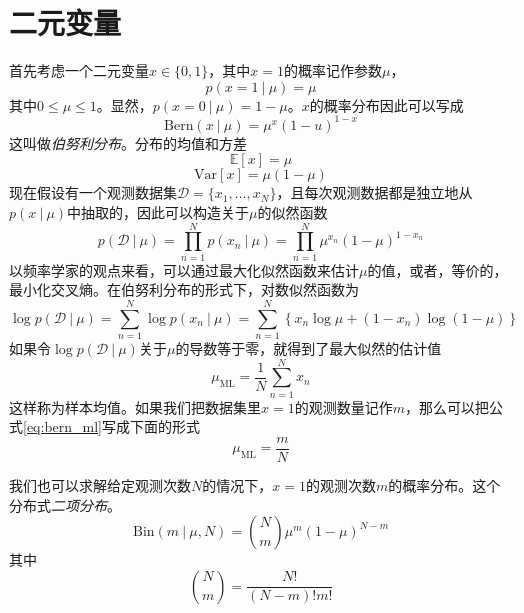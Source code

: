 \documentclass[11pt]{ctexbook}
\begin{document}
\section{二元变量}
首先考虑一个二元变量$x \in \{0, 1\}$，其中$x=1$的概率记作参数$\mu$，
\begin{equation}
	p(x=1\ |\ \mu) = \mu
\end{equation}
其中$0 \leq \mu \leq 1$。显然，$p(x=0\ |\ \mu) = 1-\mu$。$x$的概率分布因此可以写成
\begin{equation}
	\mathrm{Bern}(x \ |\ \mu) = \mu^x(1-u)^{1-x}
\end{equation}
这叫做\emph{伯努利分布}。分布的均值和方差
\begin{equation}
	\mathbb E[x] = \mu
\end{equation}
\begin{equation}
	\mathrm{Var}[x] = \mu(1-\mu)
\end{equation}
现在假设有一个观测数据集$\mathcal D = \{x_1, \ldots, x_N\}$，且每次观测数据都是独立地从$p(x\ |\ \mu)$中抽取的，因此可以构造关于$\mu$的似然函数
\begin{equation}
	\label{eq:bern-likehook}
	p(\mathcal D \ |\ \mu) = \prod_{n=1}^{N}p(x_n\ |\ \mu) = \prod_{n=1}^{N}\mu^{x_n}(1-\mu)^{1-x_n}
\end{equation}
以频率学家的观点来看，可以通过最大化似然函数来估计$\mu$的值，或者，等价的，最小化交叉熵。在伯努利分布的形式下，对数似然函数为
\begin{equation}
	\log p(\mathcal D \ |\ \mu) = \sum_{n=1}^{N}\log p(x_n\ |\ \mu) = \sum_{n=1}^{N}\left\{ x_n\log \mu + (1-x_n)\log(1-\mu) \right\}
\end{equation}
如果令$\log p(\mathcal{D}\ |\ \mu)$关于$\mu$的导数等于零，就得到了最大似然的估计值
\begin{equation}
	\label{eq:bern_ml}
	\mu_{\mathrm{ML}} = \frac{1}{N}\sum_{n=1}^{N}x_n
\end{equation}
这样称为样本均值。如果我们把数据集里$x=1$的观测数量记作$m$，那么可以把公式\ref{eq:bern_ml}写成下面的形式
\begin{equation}
	\mu_{\mathrm{ML}} = \frac{m}{N}
\end{equation}

我们也可以求解给定观测次数$N$的情况下，$x=1$的观测次数$m$的概率分布。这个分布式\emph{二项分布}。
\begin{equation}
	\mathrm{Bin}(m\ |\ \mu, N) = \binom{N}{m}\mu^m(1-\mu)^{N-m}
\end{equation}
其中
\begin{equation}
	\binom{N}{m} = \frac{N!}{(N-m)!m!}
\end{equation}
\end{document}
